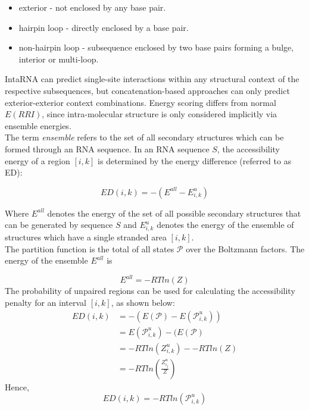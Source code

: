 \documentclass[twoside,a4paper]{report}
\numberwithin{equation}{section}
\begin{document}
	\begin{itemize}
	\item exterior - not enclosed by any base pair.
	\item hairpin loop - directly enclosed by a base pair.
	\item non-hairpin loop - subsequence enclosed by two base pairs forming a bulge, interior or multi-loop.\\
    \end{itemize}
		
	IntaRNA can predict single-site interactions within any structural context of the respective subsequences, but concatenation-based approaches can only predict exterior-exterior context combinations. Energy scoring differs from normal $E(RRI)$, since intra-molecular structure is only considered implicitly via ensemble energies.\\
	
	The term \textit{ensemble} refers to the set of all secondary structures which can be formed through an RNA sequence. In an RNA sequence $S$, the accessibility energy of a region $[i, k]$ is determined by the energy difference (referred to as ED):
	
	 \begin{equation}
	\label{eq:equ6}
		ED(i,k) = - (E^{all} - E_{i,k}^{u} )
	\end{equation}
	
	Where $E^{all}$ denotes the energy of the set of all possible secondary structures that can be generated by sequence $S$ and $E_{i,k}^{u}$ denotes the energy of the ensemble of structures which have a single stranded area $ [i,k]$. \\
	The partition function is the total of all states $\mathcal{P}$ over the Boltzmann factors. The energy of the ensemble $E^{all}$ is 
	
	 \begin{equation}
	\label{eq:equ7}	
	E^{all} = - RTln({Z})
	\end{equation}
	The probability of unpaired regions can be used for calculating the accessibility penalty for an interval $[i,k]$, as shown below: \\
	
	\begin{align*}
	ED(i,k) &= - (E(\mathcal{P}) - E(\mathcal{P}_{i,k}^{u}))\\
	&= E(\mathcal{P}_{i,k}^{u}) - (E(\mathcal{P}) \\
	&= - RTln({Z}_{i,k}^{u}) - - RTln({Z})\\
	&= - RTln(\frac{Z^u_{i_j}}{Z})
	\end{align*}
	Hence,
	\begin{equation}
	\label{eq:equ10}	
	 	ED(i,k) = - RTln(\mathcal{P}_{i,k}^{u})
	 	\end{equation}
	
\end{document}
